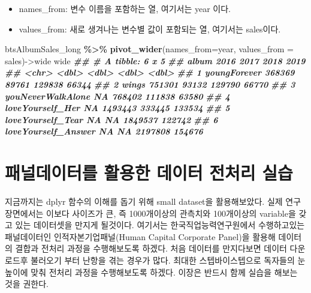 \documentclass[
]{book}
\newenvironment{Shaded}{\begin{snugshade}}{\end{snugshade}}
\newcommand{\AttributeTok}[1]{\textcolor[rgb]{0.13,0.29,0.53}{#1}}
\newcommand{\DocumentationTok}[1]{\textcolor[rgb]{0.56,0.35,0.01}{\textbf{\textit{#1}}}}
\newcommand{\FunctionTok}[1]{\textcolor[rgb]{0.13,0.29,0.53}{\textbf{#1}}}
\newcommand{\NormalTok}[1]{#1}
\newcommand{\OtherTok}[1]{\textcolor[rgb]{0.56,0.35,0.01}{#1}}
\newcommand{\SpecialCharTok}[1]{\textcolor[rgb]{0.81,0.36,0.00}{\textbf{#1}}}
\providecommand{\tightlist}{%
  \setlength{\itemsep}{0pt}\setlength{\parskip}{0pt}}
\begin{document}
\begin{itemize}
\tightlist
\item
  names\_from: 변수 이름을 포함하는 열, 여기서는 year 이다.
\item
  values\_from: 새로 생겨나는 변수별 값이 포함되는 열, 여기서는 sales이다.
\end{itemize}

\begin{Shaded}
\begin{Highlighting}[]
\NormalTok{btsAlbumSales\_long }\SpecialCharTok{\%\textgreater{}\%} 
  \FunctionTok{pivot\_wider}\NormalTok{(}\AttributeTok{names\_from=}\NormalTok{year, }\AttributeTok{values\_from =}\NormalTok{ sales)}\OtherTok{{-}\textgreater{}}\NormalTok{wide}
\NormalTok{wide}
\DocumentationTok{\#\# \# A tibble: 6 x 5}
\DocumentationTok{\#\#   album               \textasciigrave{}2016\textasciigrave{}  \textasciigrave{}2017\textasciigrave{}  \textasciigrave{}2018\textasciigrave{} \textasciigrave{}2019\textasciigrave{}}
\DocumentationTok{\#\#   \textless{}chr\textgreater{}                \textless{}dbl\textgreater{}   \textless{}dbl\textgreater{}   \textless{}dbl\textgreater{}  \textless{}dbl\textgreater{}}
\DocumentationTok{\#\# 1 youngForever        368369   89761  129838  66344}
\DocumentationTok{\#\# 2 wings               751301   93132  129790  66770}
\DocumentationTok{\#\# 3 youNeverWalkAlone       NA  768402  111838  63580}
\DocumentationTok{\#\# 4 loveYourself\_Her        NA 1493443  333445 133534}
\DocumentationTok{\#\# 5 loveYourself\_Tear       NA      NA 1849537 122742}
\DocumentationTok{\#\# 6 loveYourself\_Answer     NA      NA 2197808 154676}
\end{Highlighting}
\end{Shaded}

\section{패널데이터를 활용한 데이터 전처리 실습}\label{uxd328uxb110uxb370uxc774uxd130uxb97c-uxd65cuxc6a9uxd55c-uxb370uxc774uxd130-uxc804uxcc98uxb9ac-uxc2e4uxc2b5}

지금까지는 dplyr 함수의 이해를 돕기 위해 small dataset을 활용해보았다. 실제 연구 장면에서는 이보다 사이즈가 큰, 즉 1000개이상의 관측치와 100개이상의 variable을 갖고 있는 데이터셋을 만지게 될것이다. 여기서는 한국직업능력연구원에서 수행하고있는 패널데이터인 인적자본기업패널(Human Capital Corporate Panel)을 활용해 데이터의 결합과 전처리 과정을 수행해보도록 하겠다. 처음 데이터를 만지다보면 데이터 다운로드후 불러오기 부터 난항을 겪는 경우가 많다. 최대한 스텝바이스텝으로 독자들의 눈높이에 맞춰 전처리 과정을 수행해보도록 하겠다. 이장은 반드시 함께 실습을 해보는 것을 권한다.
\end{document}
